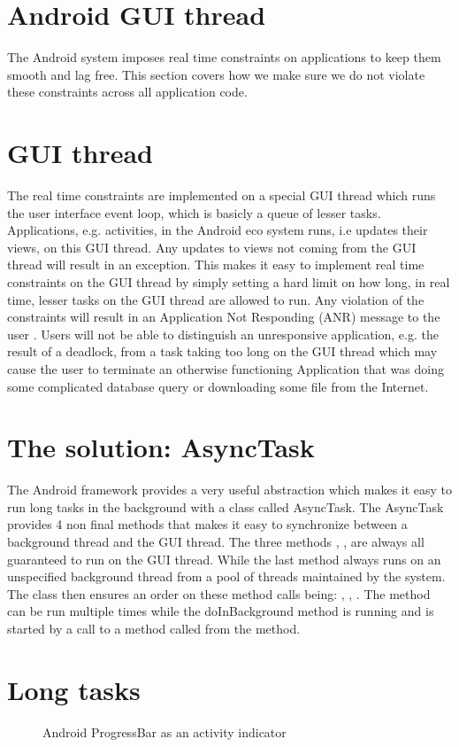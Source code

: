 
\section{Android GUI thread}
\label{sec:gui_thread_async_task}

The Android system imposes real time constraints on applications to keep them smooth and lag free. This section covers how we make sure we do not violate these constraints across all application code.

\section{GUI thread}
The real time constraints are implemented on a special GUI thread which runs the user interface event loop, which is basicly a queue of lesser tasks. Applications, e.g. activities, in the Android eco system runs, i.e updates their views, on this GUI thread. Any updates to views not coming from the GUI thread will result in an exception. This makes it easy to implement real time constraints on the GUI thread by simply setting a hard limit on how long, in real time, lesser tasks on the GUI thread are allowed to run. Any violation of the constraints will result in an Application Not Responding (ANR) message to the user \parencite{android_avoid_anr}. Users will not be able to distinguish an unresponsive application, e.g. the result of a deadlock, from a task taking too long on the GUI thread which may cause the user to terminate an otherwise functioning Application that was doing some complicated database query or downloading some file from the Internet. 

\section{The solution: AsyncTask}

The Android framework provides a very useful abstraction which makes it easy to run long tasks in the background with a class called AsyncTask. The AsyncTask provides 4 non final methods that makes it easy to synchronize between a background thread and the GUI thread. The three methods , ,  are always all guaranteed to run on the GUI thread. While the last method  always runs on an unspecified background thread from a pool of threads maintained by the system. The class then ensures an order on these method calls being: , , . The  method can be run multiple times while the doInBackground method is running and is started by a call to a method called  from the  method.  

\section{Long tasks}


\begin{figure}[!htbp]
        \centering
        \caption{Android ProgressBar as an activity indicator}
        \label{fig:activity_indicator}
\end{figure}